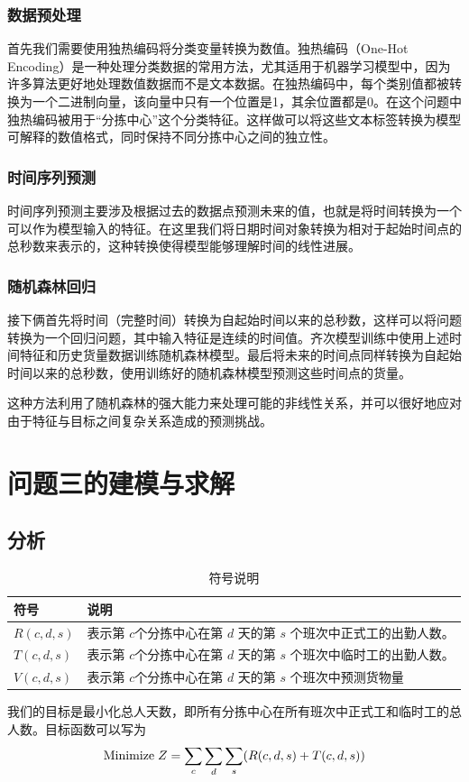 \documentclass[UTF8]{article}%
\begin{document}
\subsubsection{数据预处理}
首先我们需要使用独热编码将分类变量转换为数值。独热编码（One-Hot Encoding）是一种处理分类数据的常用方法，尤其适用于机器学习模型中，因为许多算法更好地处理数值数据而不是文本数据。在独热编码中，每个类别值都被转换为一个二进制向量，该向量中只有一个位置是1，其余位置都是0。在这个问题中独热编码被用于“分拣中心”这个分类特征。这样做可以将这些文本标签转换为模型可解释的数值格式，同时保持不同分拣中心之间的独立性。

\subsubsection{时间序列预测}

时间序列预测主要涉及根据过去的数据点预测未来的值，也就是将时间转换为一个可以作为模型输入的特征。在这里我们将日期时间对象转换为相对于起始时间点的总秒数来表示的，这种转换使得模型能够理解时间的线性进展。

\subsubsection{随机森林回归}
接下俩首先将时间（完整时间）转换为自起始时间以来的总秒数，这样可以将问题转换为一个回归问题，其中输入特征是连续的时间值。齐次模型训练中使用上述时间特征和历史货量数据训练随机森林模型。最后将未来的时间点同样转换为自起始时间以来的总秒数，使用训练好的随机森林模型预测这些时间点的货量。

这种方法利用了随机森林的强大能力来处理可能的非线性关系，并可以很好地应对由于特征与目标之间复杂关系造成的预测挑战。


\section{问题三的建模与求解}

\subsection{分析}

\begin{table}[!ht]
\caption{符号说明}%
\centering%
\begin{tabular}{p{3cm}<{\centering}p{11cm}<{\centering}}%
\toprule%
符号&说明 \\
\midrule%
$R(c,d,s)$&表示第 \(c\)个分拣中心在第 
$d$ 天的第 
$s$ 个班次中正式工的出勤人数。\\
$T(c,d,s)$&表示第 \(c\)个分拣中心在第 
$d$ 天的第 
$s$ 个班次中临时工的出勤人数。\\
$V(c,d,s)$& 表示第 \(c\)个分拣中心在第 
$d$ 天的第 
$s$ 个班次中预测货物量\\
\bottomrule%
\end{tabular}
\end{table}
我们的目标是最小化总人天数，即所有分拣中心在所有班次中正式工和临时工的总人数。目标函数可以写为
\begin{align*}
    {\rm Minimize\;}Z = \sum_{c}\sum_{d}\sum_{s}(R(c,d,s)+T(c,d,s))
\end{align*}
\end{document}
